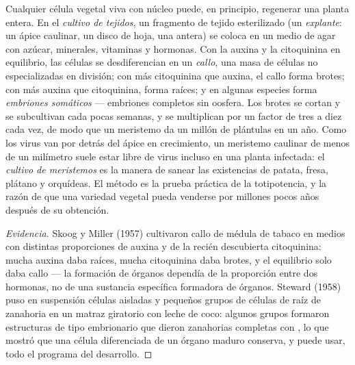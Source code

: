 \begin{proposition}\label{prop:b2:asexual-reproduction:tissueculture}
Cualquier célula vegetal viva con núcleo puede, en principio, regenerar
una planta entera. En el \emph{cultivo de tejidos}, un fragmento de
tejido esterilizado (un \emph{explante}: un ápice caulinar, un disco de
hoja, una antera) se coloca en un medio de agar con azúcar, minerales,
vitaminas y hormonas. Con la auxina y la citoquinina en equilibrio, las
células se desdiferencian en un \emph{callo}, una masa de células no
especializadas en división; con más citoquinina que auxina, el callo
forma brotes; con más auxina que citoquinina, forma raíces; y en algunas
especies forma \emph{embriones somáticos} --- embriones completos sin
oosfera. Los brotes se cortan y se subcultivan cada pocas semanas, y se
multiplican por un factor de tres a diez cada vez, de modo que un
meristemo da un millón de plántulas en un año. Como los virus van por
detrás del ápice en crecimiento, un meristemo caulinar de menos de un
milímetro suele estar libre de virus incluso en una planta infectada: el
\emph{cultivo de meristemos} es la manera de sanear las existencias de
patata, fresa, plátano y orquídeas. El método es la prueba práctica de la
totipotencia, y la razón de que una variedad vegetal pueda venderse por
millones pocos años después de su obtención.
\end{proposition}
\begin{proof}[Evidencia]
Skoog y Miller (1957) cultivaron callo de médula de tabaco en medios con
distintas proporciones de auxina y de la recién descubierta citoquinina:
mucha auxina daba raíces, mucha citoquinina daba brotes, y el equilibrio
solo daba callo --- la formación de órganos dependía de la proporción
entre dos hormonas, no de una sustancia específica formadora de órganos.
Steward (1958) puso en suspensión células aisladas y pequeños grupos de
células de raíz de zanahoria en un matraz giratorio con leche de coco:
algunos grupos formaron estructuras de tipo embrionario que dieron
zanahorias completas con , lo que mostró que una célula
diferenciada de un órgano maduro conserva, y puede usar, todo el
programa del desarrollo.
\end{proof}

